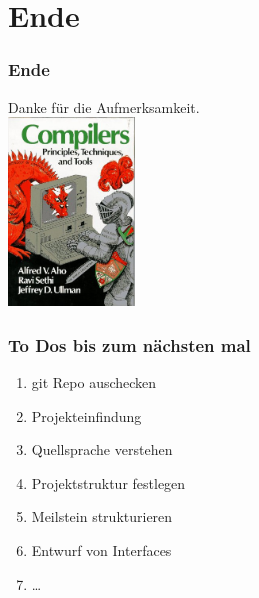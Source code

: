 \documentclass[ucs,9pt]{beamer}
\begin{document}
\section{Ende}
\begin{frame}
  \frametitle{Ende}
  \begin{center}
    \Huge
    Danke für die Aufmerksamkeit.\\[1em]
    \includegraphics[height=5cm]{compilers}
    \ 
  \end{center}
\end{frame}

\begin{frame}
    \frametitle{To Dos bis zum nächsten mal}
    \begin{center}
        \begin{enumerate}
            \item git Repo auschecken
            \item Projekteinfindung
            \item Quellsprache verstehen
            \item Projektstruktur festlegen
            \item Meilstein strukturieren
            \item Entwurf von Interfaces
            \item \dots
        \end{enumerate}
    \end{center}
\end{frame}

\appendix
\section*{\appendixname}
\end{document}

